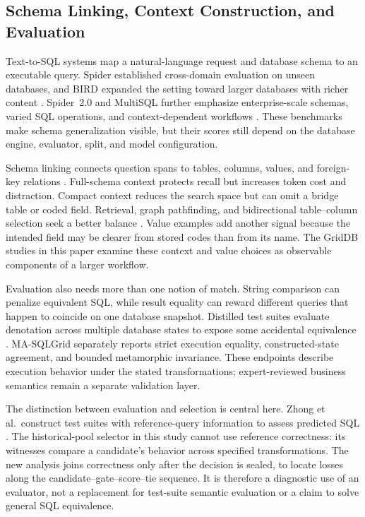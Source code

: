 \documentclass[information,article,submit,moreauthors]{Definitions/mdpi}
\newcommand{\masql}{MA-SQLGrid}
\begin{document}
\subsection{Schema Linking, Context Construction, and Evaluation}

Text-to-SQL systems map a natural-language request and database schema to an executable query. Spider established cross-domain evaluation on unseen databases, and BIRD expanded the setting toward larger databases with richer content \cite{yu2018spider,li2023bird}. Spider~2.0 and MultiSQL further emphasize enterprise-scale schemas, varied SQL operations, and context-dependent workflows \cite{lei2025spider2,li2024multisql}. These benchmarks make schema generalization visible, but their scores still depend on the database engine, evaluator, split, and model configuration.

Schema linking connects question spans to tables, columns, values, and foreign-key relations \cite{wang2020ratsql,lei2020reexamining,liu2022semantic}. Full-schema context protects recall but increases token cost and distraction. Compact context reduces the search space but can omit a bridge table or coded field. Retrieval, graph pathfinding, and bidirectional table--column selection seek a better balance \cite{bozdemir2026schema,liu2025solidsql,hao2025genlink,wang2025linkalign,safdarian2026schemagraphsql,nahid2026bidirectional}. Value examples add another signal because the intended field may be clearer from stored codes than from its name. The GridDB studies in this paper examine these context and value choices as observable components of a larger workflow.

Evaluation also needs more than one notion of match. String comparison can penalize equivalent SQL, while result equality can reward different queries that happen to coincide on one database snapshot. Distilled test suites evaluate denotation across multiple database states to expose some accidental equivalence \cite{zhong2020semantic}. \masql{} separately reports strict execution equality, constructed-state agreement, and bounded metamorphic invariance. These endpoints describe execution behavior under the stated transformations; expert-reviewed business semantics remain a separate validation layer.

The distinction between evaluation and selection is central here. Zhong et al.\ construct test suites with reference-query information to assess predicted SQL \cite{zhong2020semantic}. The historical-pool selector in this study cannot use reference correctness: its witnesses compare a candidate's behavior across specified transformations. The new analysis joins correctness only after the decision is sealed, to locate losses along the candidate--gate--score--tie sequence. It is therefore a diagnostic use of an evaluator, not a replacement for test-suite semantic evaluation or a claim to solve general SQL equivalence.
\end{document}
